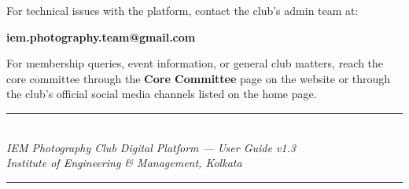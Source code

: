 \documentclass[12pt,a4paper]{article}
\begin{document}
For technical issues with the platform, contact the club's admin team at:

\begin{center}
\textbf{iem.photography.team@gmail.com}
\end{center}

For membership queries, event information, or general club matters, reach the core committee through the \textbf{Core Committee} page on the website or through the club's official social media channels listed on the home page.

\vspace{1cm}
\begin{center}
\color{ClubGray}
\rule{0.5\linewidth}{0.4pt}\\[6pt]
\textit{\small IEM Photography Club Digital Platform --- User Guide v1.3}\\
\textit{\small Institute of Engineering \& Management, Kolkata}\\[4pt]
\rule{0.5\linewidth}{0.4pt}
\end{center}
\end{document}

